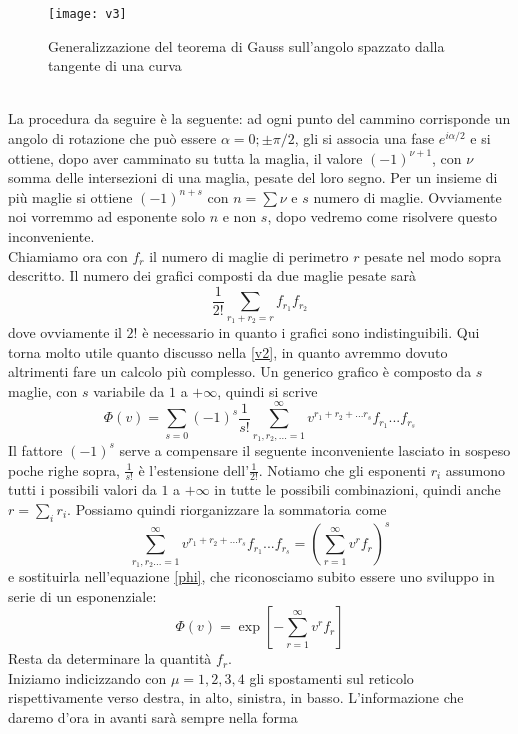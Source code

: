 \documentclass[11pt]{article}
\begin{document}
\begin{figure}[h]
\centering
\texttt{[image: v3]}
\caption{Generalizzazione del teorema di Gauss sull'angolo spazzato dalla tangente di una curva}
\label{v3}
\end{figure}
\\ La procedura da seguire è la seguente: ad ogni punto del cammino corrisponde un angolo di rotazione che può essere $\alpha=0;\pm\pi/2$, gli si associa una fase $e^{i\alpha/2}$ e si ottiene, dopo aver camminato su tutta la maglia, il valore $(-1)^{\nu+1}$, con $\nu$ somma delle intersezioni di una maglia, pesate del loro segno. Per un insieme di più maglie si ottiene $(-1)^{n+s}$ con $n=\sum\nu$ e $s$ numero di maglie. Ovviamente noi vorremmo ad esponente solo $n$ e non $s$, dopo vedremo come risolvere questo inconveniente.\\
Chiamiamo ora con $f_r$ il numero di maglie di perimetro $r$ pesate nel modo sopra descritto. Il numero dei grafici composti da due maglie pesate sarà
$$\frac{1}{2!}\sum_{r_1+r_2=r}f_{r_1}f_{r_2}$$
dove ovviamente il $2!$ è necessario in quanto i grafici sono indistinguibili. Qui torna molto utile quanto discusso nella \ref{v2}, in quanto avremmo dovuto altrimenti fare un calcolo più complesso. Un generico grafico è composto da $s$ maglie, con $s$ variabile da $1$ a $+\infty$, quindi si scrive
\begin{equation} \label{phi}
\Phi(v)=\sum_{s=0}(-1)^s\frac{1}{s!}\sum_{r_1,r_2,...=1}^\infty v^{r_1+r_2+...r_s}f_{r_1}...f_{r_s}
\end{equation}
Il fattore $(-1)^s$ serve a compensare il seguente inconveniente lasciato in sospeso poche righe sopra, $\frac{1}{s!}$ è l'estensione dell'$\frac{1}{2!}$. Notiamo che gli esponenti $r_i$ assumono tutti i possibili valori da $1$ a $+\infty$ in tutte le possibili combinazioni, quindi anche $r=\sum_i r_i$. Possiamo quindi riorganizzare la sommatoria come
$$\sum_{r_1,r_2...=1}^\infty v^{r_1+r_2+...r_s}f_{r_1}...f_{r_s}=\left( \sum_{r=1}^\infty v^rf_r \right)^s$$
e sostituirla nell'equazione \ref{phi}, che riconosciamo subito essere uno sviluppo in serie di un esponenziale:
\begin{equation}\label{phi2}
 \Phi(v)= \exp \left[ - \sum_{r=1}^\infty v^r f_r \right]
\end{equation}
Resta da determinare la quantità $f_r$.\\
Iniziamo indicizzando con $\mu=1,2,3,4$ gli spostamenti sul reticolo rispettivamente verso destra, in alto, sinistra, in basso.
L'informazione che daremo d'ora in avanti sarà sempre nella forma
\end{document}
